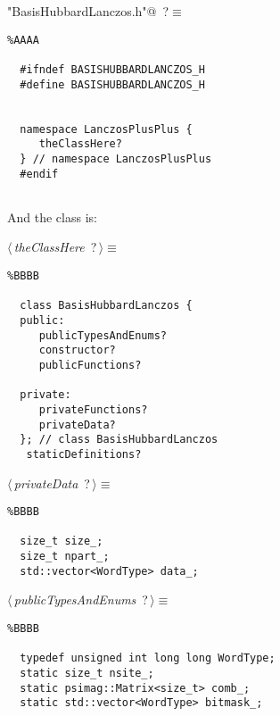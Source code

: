 \documentclass{report}
\begin{document}
\begin{flushleft} \small
\begin{minipage}{\linewidth}\label{scrap2}\raggedright\small
{} \verb@"BasisHubbardLanczos.h"@\nobreak\ {\footnotesize {?}}$\equiv$
\vspace{-1ex}
\begin{lstlisting}%AAAA
    
  #ifndef BASISHUBBARDLANCZOS_H  
  #define BASISHUBBARDLANCZOS_H  
    
    
  namespace LanczosPlusPlus {  
  	 theClassHere?  
  } // namespace LanczosPlusPlus  
  #endif  
    
   \end{lstlisting}
\end{minipage}
\end{flushleft}
And the class is:
\begin{flushleft} \small
\begin{minipage}{\linewidth}\label{scrap3}\raggedright\small
{} $\langle\,${\it theClassHere}\nobreak\ {\footnotesize {?}}$\,\rangle\equiv$
\begin{lstlisting}%BBBB
    
  class BasisHubbardLanczos {  
  public:  
  	 publicTypesAndEnums?  
  	 constructor?  
  	 publicFunctions?  
    
  private:  
  	 privateFunctions?  
  	 privateData?  
  }; // class BasisHubbardLanczos  
   staticDefinitions?  
   \end{lstlisting}
\end{minipage}\vspace{4ex}
\end{flushleft}
\begin{flushleft} \small
\begin{minipage}{\linewidth}\label{scrap4}\raggedright\small
{} $\langle\,${\it privateData}\nobreak\ {\footnotesize {?}}$\,\rangle\equiv$
\begin{lstlisting}%BBBB
    
  size_t size_;  
  size_t npart_;  
  std::vector<WordType> data_;  
   \end{lstlisting}
\end{minipage}\vspace{4ex}
\end{flushleft}
\begin{flushleft} \small
\begin{minipage}{\linewidth}\label{scrap5}\raggedright\small
{} $\langle\,${\it publicTypesAndEnums}\nobreak\ {\footnotesize {?}}$\,\rangle\equiv$
\begin{lstlisting}%BBBB
    
  typedef unsigned int long long WordType;  
  static size_t nsite_;  
  static psimag::Matrix<size_t> comb_;  
  static std::vector<WordType> bitmask_;  \end{lstlisting}
\end{minipage}\vspace{4ex}
\end{flushleft}
\end{document}

